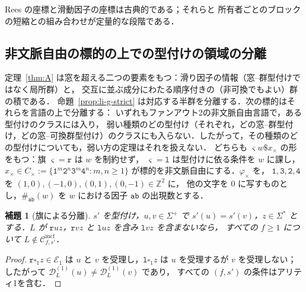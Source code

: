 \documentclass[11pt,a4paper]{ltjsarticle}
\numberwithin{equation}{section}
\theoremstyle{plain}
\newtheorem{lemma}[theorem]{補題}
\theoremstyle{definition}
\theoremstyle{remark}
\newcommand{\Cmcf}[2]{\mathcal{C}^{\mathrm{mcf}}_{#1,#2}}
\newcommand{\D}{\mathcal{D}}
\newcommand{\blank}{\square}
\theoremstyle{plain}
\begin{document}
Rees の座標と滑動因子の座標は古典的である；それらと
所有者ごとのブロックの短縮との組み合わせが定量的な段階である．

\subsection{非文脈自由の標的の上での型付けの領域の分離}
\label{subsec:features-needed}

定理~\ref{thm:A} は窓を超える二つの要素をもつ：滑り因子の情報（窓--群型付けではなく局所群）と，
交互に並ぶ成分にわたる順序付きの（非可換でもよい）群の積である．
命題~\ref{prop:li-g-strict} は対応する半群を分離する．次の標的はそれらを言語の上で分離する：
いずれもファンアウト2の非文脈自由言語で，ある型付けのクラスには入り，
弱い種類のどの型付け（それぞれ，どの窓--群型付け，どの窓--可換群型付け）のクラスにも入らない．したがって，その種類のどの型付けについても，弱い方の定理はそれを扱えない．
どちらも $\varsigma w\mathtt\$x_\times$ の形をもつ：旗 $\varsigma=\mathtt r$ は $w$ を制約せず，
$\varsigma=\mathtt l$ は型付けに依る条件を $w$ に課し，
$x_\times\in C_\times:=\{\mathtt{1}^m\mathtt{2}^n\mathtt{3}^m\mathtt{4}^n:m,n\ge1\}$
が標的を非文脈自由にする．$\varphi_\times$ を，
$\mathtt 1,\mathtt 3,\mathtt 2,\mathtt 4$ を $(1,0),(-1,0),(0,1),(0,-1)\in\mathbb Z^2$ に，
他の文字を $0$ に写すものとし，$\#_{\mathtt{ab}}(w)$ を $w$ における因子 $\mathtt{ab}$ の出現数とする．

\begin{lemma}[旗による分離]
\label{lem:flag-separation}
$s'$ を型付け，$u,v\in\Sigma^+$ で $s'(u)=s'(v)$，$z\in\Sigma^*$ とする．$L$ が
$\mathtt ruz$，$\mathtt rvz$ と $\mathtt luz$ を含み $\mathtt lvz$ を含まないなら，
すべての $f\ge1$ について $L\notin\Cmcf{f}{s'}$．
\end{lemma}

\begin{proof}
$\mathtt r\blank_1z\in\mathcal E_1$ は $u$ と $v$ を受理し，$\mathtt l\blank_1z$ は
$u$ を受理するが $v$ を受理しない；したがって $\D^{(1)}_L(u)\ne\D^{(1)}_L(v)$ であり，
すべての $(f,s')$ の条件はアリティ1を含む．
\end{proof}
\end{document}
